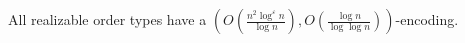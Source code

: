 \begin{theorem}\label{thm:realizable-loglog}
  All realizable order types have a
  \((O(\frac{n^2\log^\varepsilon n}{\log n}),
  O(\frac{\log{n}}{\log{\log{n}}}))\)-encoding.
\end{theorem}
